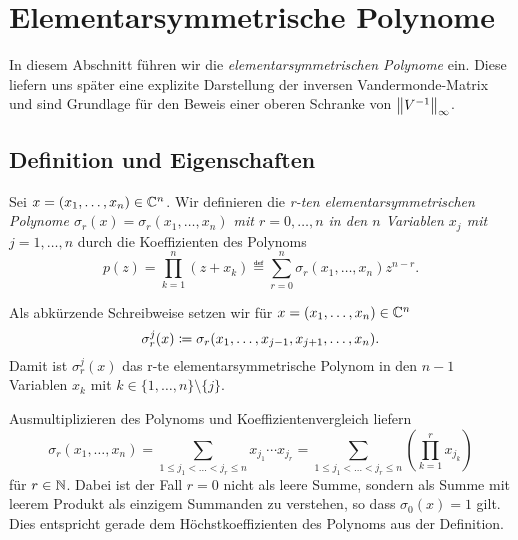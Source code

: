 \chapter{Elementarsymmetrische Polynome}

In diesem Abschnitt führen wir die \emph{elementarsymmetrischen Polynome} ein.
Diese liefern uns später eine explizite Darstellung der inversen
Vandermonde-Matrix und sind Grundlage für den Beweis einer oberen Schranke von
$\left\lVert V^{-1} \right\rVert_\infty$.

\section{Definition und Eigenschaften}

\begin{mydef}
    Sei $x = (x_1, \dots, x_{n}) \in \mathbb{C}^n$. Wir definieren die
    \emph{r-ten elementarsymmetrischen Polynome
    $\sigma_{r}(x) = \sigma_{r}(x_1, \dots, x_{n})$ mit $r = 0, \dots, n$
    in den $n$ Variablen $x_j$ mit $j = 1, \dots, n$} durch die Koeffizienten
    des Polynoms
    \[
        p(z)
        = \prod_{k=1}^{n} (z + x_k)
        \eqdef \sum_{r=0}^{n} \sigma_{r}(x_1, \dots, x_{n}) z^{n-r}.
    \]
\end{mydef}

\begin{notation}
    Als abkürzende Schreibweise setzen wir für
    ${x = (x_1, \dots, x_{n}) \in \mathbb{C}^n}$
    \[
        \sigma_{r}^{j}(x) \coloneqq \sigma_{r}(x_1, \dots, x_{j-1}, x_{j+1}, \dots, x_{n}).
    \]
    Damit ist $\sigma_{r}^{j}(x)$ das r-te elementarsymmetrische Polynom in den
    $n-1$ Variablen $x_k$ mit $k \in \{ 1, \dots, n \} \setminus \{ j \}$.
\end{notation}

\begin{remark}
    Ausmultiplizieren des Polynoms und Koeffizientenvergleich liefern
    \begin{equation}
        \label{eq:explicit_elementary_symmetric_polynomials}
        \sigma_{r}(x_1, \dots, x_{n})
        = \sum_{1 \leq j_1 < \dots < j_r \leq n} x_{j_1} \cdots x_{j_r}
        = \sum_{1 \leq j_1 < \dots < j_r \leq n} \left( \prod_{k=1}^r x_{j_k} \right)
    \end{equation}
    für $r \in \mathbb{N}$.
    Dabei ist der Fall $r = 0$ nicht als leere Summe, sondern als Summe mit
    leerem Produkt als einzigem Summanden zu verstehen, so dass
    $\sigma_0(x) = 1$ gilt. Dies entspricht gerade dem Höchstkoeffizienten des
    Polynoms aus der Definition.
\end{remark}


